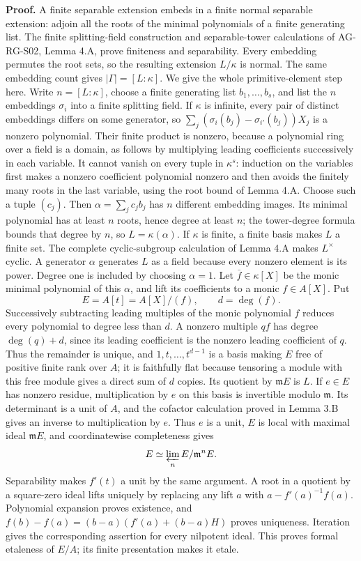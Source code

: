 \documentclass[11pt,a4paper,openany]{report}
\begin{document}
\textbf{Proof.} A finite separable extension embeds in a finite normal separable extension: adjoin all the roots of the minimal polynomials of a finite generating list. The finite splitting-field construction and separable-tower calculations of AG-RG-S02, Lemma 4.A, prove finiteness and separability. Every embedding permutes the root sets, so the resulting extension \(L/\kappa\) is normal. The same embedding count gives \(|\Gamma|=[L:\kappa]\). We give the whole primitive-element step here. Write \(n=[L:\kappa]\), choose a finite generating list \(b_1,\ldots,b_s\), and list the \(n\) embeddings \(\sigma_i\) into a finite splitting field. If \(\kappa\) is infinite, every pair of distinct embeddings differs on some generator, so \(\sum_j(\sigma_i(b_j)-\sigma_{i'}(b_j))X_j\) is a nonzero polynomial. Their finite product is nonzero, because a polynomial ring over a field is a domain, as follows by multiplying leading coefficients successively in each variable. It cannot vanish on every tuple in \(\kappa^s\): induction on the variables first makes a nonzero coefficient polynomial nonzero and then avoids the finitely many roots in the last variable, using the root bound of Lemma 4.A. Choose such a tuple \((c_j)\). Then \(\alpha=\sum_j c_jb_j\) has \(n\) different embedding images. Its minimal polynomial has at least \(n\) roots, hence degree at least \(n\); the tower-degree formula bounds that degree by \(n\), so \(L=\kappa(\alpha)\). If \(\kappa\) is finite, a finite basis makes \(L\) a finite set. The complete cyclic-subgroup calculation of Lemma 4.A makes \(L^\times\) cyclic. A generator \(\alpha\) generates \(L\) as a field because every nonzero element is its power. Degree one is included by choosing \(\alpha=1\). Let \(\bar f\in\kappa[X]\) be the monic minimal polynomial of this \(\alpha\), and lift its coefficients to a monic \(f\in A[X]\). Put \[
E=A[t]=A[X]/(f),\qquad d=\deg(f).
\] Successively subtracting leading multiples of the monic polynomial \(f\) reduces every polynomial to degree less than \(d\). A nonzero multiple \(qf\) has degree \(\deg(q)+d\), since its leading coefficient is the nonzero leading coefficient of \(q\). Thus the remainder is unique, and \(1,t,\ldots,t^{d-1}\) is a basis making \(E\) free of positive finite rank over \(A\); it is faithfully flat because tensoring a module with this free module gives a direct sum of \(d\) copies. Its quotient by \(\mathfrak mE\) is \(L\). If \(e\in E\) has nonzero residue, multiplication by \(e\) on this basis is invertible modulo \(\mathfrak m\). Its determinant is a unit of \(A\), and the cofactor calculation proved in Lemma 3.B gives an inverse to multiplication by \(e\). Thus \(e\) is a unit, \(E\) is local with maximal ideal \(\mathfrak mE\), and coordinatewise completeness gives \[
E\simeq\varprojlim_n E/\mathfrak m^nE.
\] Separability makes \(f'(t)\) a unit by the same argument. A root in a quotient by a square-zero ideal lifts uniquely by replacing any lift \(a\) with \(a-f'(a)^{-1}f(a)\). Polynomial expansion proves existence, and \(f(b)-f(a)=(b-a)(f'(a)+(b-a)H)\) proves uniqueness. Iteration gives the corresponding assertion for every nilpotent ideal. This proves formal etaleness of \(E/A\); its finite presentation makes it etale.
\end{document}
